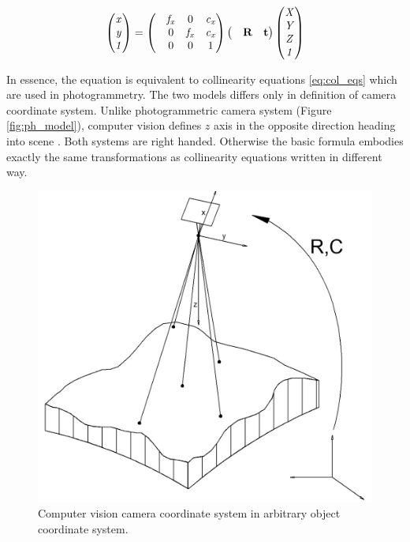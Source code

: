 \documentclass[a4paper,12pt]{article}
\newcommand{\ematr}[1]{%
{\bf #1}%
}
\newcommand{\evect}[1]{%
{\bf #1}%
}
\newcommand{\escal}[1]{%
{\it #1}%
}
\begin{document}
\begin{equation}
\begin{pmatrix}
   \escal{x} \\
   \escal{y} \\
   \escal{1} \\
\end{pmatrix}
=
\begin{pmatrix}
   & \escal{f_{x}} & 0     & \escal{c_{x}}\\
   & 0     & \escal{f_{x}} & \escal{c_{x}}\\
   & 0     & 0     & 1\\
\end{pmatrix}
\begin{pmatrix}
&\ematr{R}&\evect{t}\\
\end{pmatrix}
\begin{pmatrix}
   \escal{X} \\
   \escal{Y} \\
   \escal{Z} \\
   \escal{1} \\
\end{pmatrix}
\end{equation}

In essence, the equation is equivalent to collinearity equations \eqref{eq:col_eqs} which are used in photogrammetry.
The two models differs only in definition of camera coordinate system.
Unlike photogrammetric camera system (Figure \ref{fig:ph_model}), computer vision defines $z$ axis in the opposite direction heading into scene \cite[p. 156]{Hartley2004}.
Both systems are right handed.
Otherwise the basic formula embodies exactly the same transformations as collinearity equations written in different way.

\begin{figure}[h]
    \centering
    \includegraphics[scale=0.3]{figures/cv_object.png}
    \caption{Computer vision camera coordinate system in arbitrary object coordinate system.}
    \label{fig:cv_model}
\end{figure}
\end{document}
